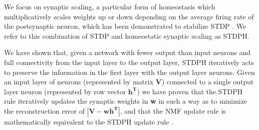 We focus on synaptic scaling, a particular form of homeostasis which
multiplicatively scales weights up or down
depending on the average firing rate of the postsynaptic neuron, which has
been demonstrated to stabilize \ac{STDP} \citep{Carlson2013,Buonomano2005,VanRossum2000}.
We refer to this combination of \ac{STDP} and homeostatic synaptic scaling
as \ac{STDPH}.


We have shown that, given a network with fewer output than input neurons and full connectivity from the input layer to the output layer, \ac{STDPH} iteratively acts to preserve the information in the first layer with the output layer neurons. Given an input layer of neurons (represented by matrix \textbf{V}) connected to a single output layer neuron (represented by row vector $\mathbf{h^T}$) we have proven that the \ac{STDPH} rule iteratively updates the synaptic weights in \textbf{w} in such a way as to minimize the reconstruction error of $|\mathbf{V} - \mathbf{wh^T}|$, and that the \ac{NMF} update rule is mathematically equivalent to the \ac{STDPH} update rule \citep{Carlson2013}.




